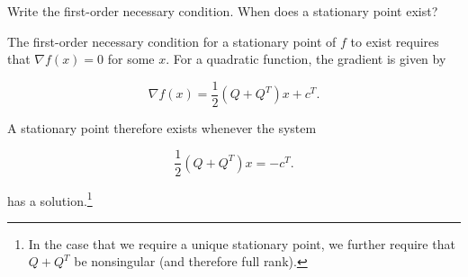 Write the first-order necessary condition. When does a stationary point exist?

\begin{solution}
    The first-order necessary condition for a stationary point of $f$ to exist requires that $\nabla f(x) = 0$ for some
    $x$. For a quadratic function, the gradient is given by

    $$
    \nabla f(x) = \frac{1}{2}\left(Q + Q^T\right)x + c^T.
    $$

    A stationary point therefore exists whenever the system

    $$
    \frac{1}{2}\left(Q + Q^T\right)x = -c^T.
    $$

    has a solution.\footnote{
        In the case that we require a unique stationary point, we further require that $Q + Q^T$ be nonsingular 
        (and therefore full rank).
    }
    \ \\
\end{solution}
